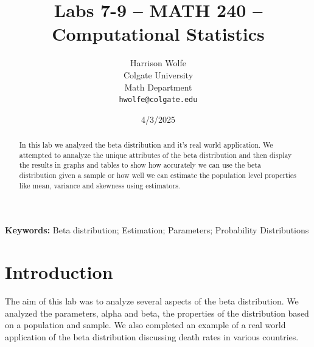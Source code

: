 \documentclass{article}\usepackage[]{graphicx}\usepackage[]{xcolor}
\begin{document}
\vspace{-1in}
\title{Labs 7-9 -- MATH 240 -- Computational Statistics}

\author{
  Harrison Wolfe \\
  Colgate University  \\
  Math Department  \\
  {\tt hwolfe@colgate.edu}
}

\date{4/3/2025}

\maketitle

\begin{multicols}{2}
\begin{abstract}
In this lab we analyzed the beta distribution and it's real world application. We attempted to annalyze the unique attributes of the beta distribution and then display the results in graphs and tables to show how accurately we can use the beta distribution given a sample or how well we can estimate the population level properties like mean, variance and skewness using estimators. 
\end{abstract}

\noindent \textbf{Keywords:} Beta distribution; Estimation; Parameters; Probability Distributions

\section{Introduction}
The aim of this lab was to analyze several aspects of the beta distribution. We analyzed the parameters, alpha and beta, the properties of the distribution based on a population and sample. We also completed an example of a real world application of the beta distribution discussing death rates in various countries. 


\end{multicols}
\end{document}
